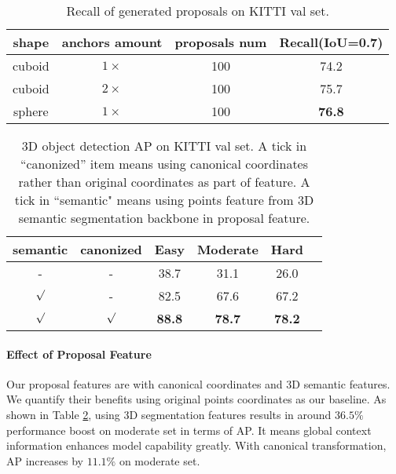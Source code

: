 \documentclass[10pt,twocolumn,letterpaper]{article}
\begin{document}
\begin{table}[t]
   \centering \addtolength{\tabcolsep}{-1pt}
   \footnotesize
   \begin{tabular}{|c|c|c|c|}
       \hline
       shape & anchors amount & proposals num & Recall(IoU=0.7) \\
       \hline
       cuboid & $1 \times$ & 100 & 74.2 \\
       cuboid & $2 \times$ & 100 & 75.7 \\
       sphere & $1 \times$ & 100 & \bf 76.8 \\
      \hline
   \end{tabular}\vspace{0.1cm}
   \caption{Recall of generated proposals on KITTI val set.}
   \label{tab:whether_sphere}
\end{table}

\begin{table}[t]
   \centering \addtolength{\tabcolsep}{-1pt}
   \footnotesize
   \begin{tabular}{|c|c|c|c|c|c|}
       \hline
       semantic & canonized  & Easy & Moderate & Hard \\
       \hline
       - & - & 38.7 & 31.1 & 26.0 \\
       $\surd$ & - & 82.5 & 67.6 & 67.2 \\
       $\surd$ & $\surd$ & \bf 88.8 & \bf 78.7 & \bf 78.2 \\
      \hline
   \end{tabular}\vspace{0.1cm}
   \caption{3D object detection AP on KITTI val set. A tick in “canonized” item means using canonical coordinates rather than original coordinates as part of feature. A tick in ``semantic" means using points feature from 3D semantic segmentation backbone in proposal feature.}\vspace{-0.05in}
   \label{tab:whether_coord}
\end{table}

\vspace{-0.1in}
\paragraph{Effect of Proposal Feature}
Our proposal features are with canonical coordinates and 3D semantic features. We quantify their benefits using original points coordinates as our baseline. As shown in Table \ref{tab:whether_coord}, using 3D segmentation features results in around $36.5 \%$ performance boost on moderate set in terms of AP. It means global context information enhances model capability greatly. With canonical transformation, AP increases by $11.1 \%$ on moderate set. 
\end{document}
